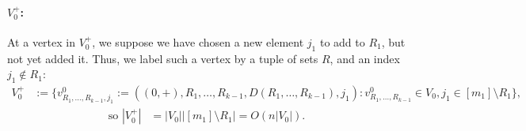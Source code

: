 \documentclass{article}
\renewcommand{\>}{\rangle}
\newcommand{\<}{\langle}
\renewcommand{\(}{\left(}
\renewcommand{\)}{\right)}
\def\abs#1{\left| #1 \right|}
\begin{document}
\paragraph{$V_0^+$:} At a vertex in $V_0^+$, we suppose we have chosen a new element $j_1$ to add to $R_1$, but not yet added it. Thus, we label such a vertex by a tuple of sets $R$, and an index $j_1\not\in R_1$: 
\begin{align*}
	V_0^+ & :=\Big\{v^{0}_{R_1,\dots,R_{k-1},j_1}:=((0,+),R_1,\dots,R_{k-1},D(R_1,\dots,R_{k-1}),j_1): 
	 v^0_{R_1,\dots,R_{k-1}} \in V_0, j_1\in [m_1]\setminus R_1\Big\},
\end{align*}
\begin{equation}
\begin{split}
\mbox{so } 
	\abs{V_0^+} &= \abs{V_0}\abs{[m_1] \setminus R_1} = O\left(n\abs{V_0}\right).
\end{split}\label{eq:kV1}
\end{equation}
\end{document}
